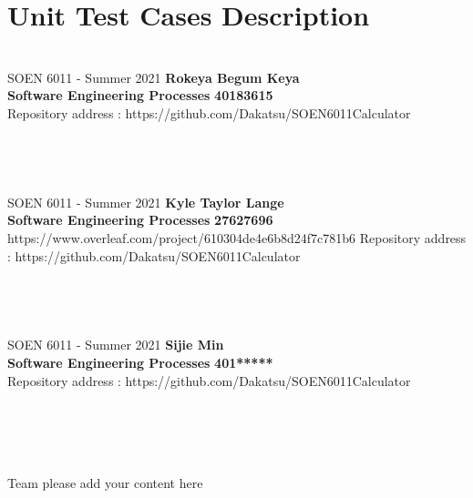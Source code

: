 \documentclass[a4paper, 11pt]{report}
\begin{document}
\section*{Unit Test Cases Description}
\section*{}
\normalsize {SOEN 6011 - Summer 2021} \hfill \textbf{Rokeya Begum Keya} \\
\textbf{ Software Engineering Processes}  \hfill \textbf{40183615} \\
\hfill Repository address : https://github.com/Dakatsu/SOEN6011Calculator
\\\\\\

\pagebreak

\section*{}
\normalsize {SOEN 6011 - Summer 2021} \hfill \textbf{Kyle Taylor Lange} \\
\textbf{ Software Engineering Processes}  \hfill \textbf{27627696} \\https://www.overleaf.com/project/610304de4e6b8d24f7c781b6
\hfill Repository address : https://github.com/Dakatsu/SOEN6011Calculator
\\\\\\

\pagebreak

\section*{}
\normalsize {SOEN 6011 - Summer 2021} \hfill \textbf{Sijie Min} \\
\textbf{ Software Engineering Processes}  \hfill \textbf{401*****} \\
\hfill Repository address : https://github.com/Dakatsu/SOEN6011Calculator
\\\\\\\\\\
 \begin{center} Team please add your content here \end{center}
\pagebreak
\end{document}
